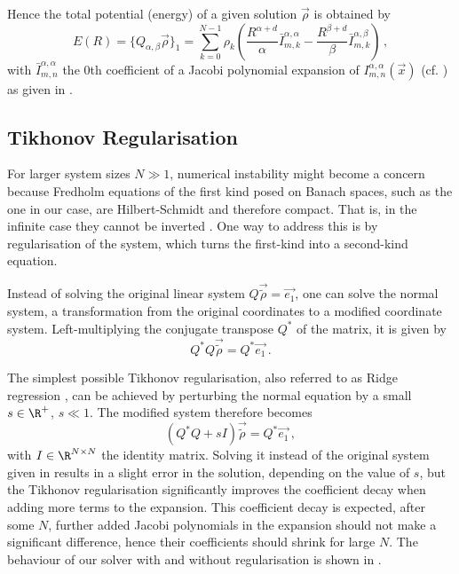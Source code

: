 Hence the total potential (energy) of a given solution $\vec{\rho}$ is obtained by
\begin{equation}
  E(R) = \{Q_{\alpha,\beta} \vec{\rho}\}_1 = \sum_{k=0}^{N-1} \rho_k \left(\frac{R^{\alpha+d}}{\alpha} \bar{I}_{m,k}^{\alpha,\alpha} - \frac{R^{\beta+d}}{\beta} \bar{I}_{m,k}^{\alpha,\beta}\right)\,,
  \label{eq:total-energy-for-ansatz}
\end{equation}
with $\bar{I}_{m,n}^{\alpha,\alpha}$ the 0th coefficient of a Jacobi polynomial expansion of $I_{m,n}^{\alpha,\alpha}(\vec{x})$ (cf. ) as given in .

\subsection{Tikhonov Regularisation}
\label{sec:regularisation}
For larger system sizes $N \gg 1$, numerical instability might become a concern because Fredholm equations of the first kind posed on Banach spaces, such as the one in our case, are Hilbert-Schmidt and therefore compact.
That is, in the infinite case they cannot be inverted \parencite{2021-arbitrary-dimensions}.
One way to address this is by regularisation of the system, which turns the first-kind into a second-kind equation.

Instead of solving the original linear system $Q \vec{\tilde{\rho}} = \vec{e_1}$, one can solve the normal system, a transformation from the original coordinates to a modified coordinate system.
Left-multiplying the conjugate transpose $Q^*$ of the matrix, it is given by
$$Q^* Q \vec{\tilde{\rho}} = Q^* \vec{e_1}\,.$$

The simplest possible Tikhonov regularisation, also referred to as Ridge regression \parencite{1970-ridge-regression}, can be achieved by perturbing the normal equation by a small $s \in \R^+$, $s \ll 1$.
The modified system therefore becomes
$$(Q^* Q + sI) \vec{\tilde{\rho}} = Q^* \vec{e_1}\,,$$
with $I \in \R^{N \times N}$ the identity matrix.
Solving it instead of the original system given in  results in a slight error in the solution, depending on the value of $s$, but the Tikhonov regularisation significantly improves the coefficient decay when adding more terms to the expansion.
This coefficient decay is expected, after some $N$, further added Jacobi polynomials in the expansion should not make a significant difference, hence their coefficients should shrink for large $N$.
The behaviour of our solver with and without regularisation is shown in .
